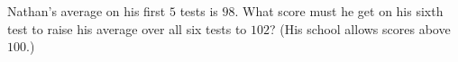 Nathan's average on his first $5$ tests is $98$. What score must he get on his sixth test to raise his average over all six tests to $102$? (His school allows scores above $100$.)
